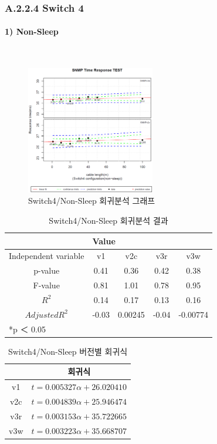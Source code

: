 \documentclass[11pt
  , a4paper
  , article
  , oneside
]{memoir}
\begin{document}
\subsubsection{A.2.2.4 Switch 4}
\paragraph{1) Non-Sleep}
   　
\begin{figure}[h!]
  \centering
  \includegraphics[width=0.5\textwidth]{./images/s4sx.eps}
  \caption{Switch4/Non-Sleep 회귀분석 그래프}
\end{figure}


\begin{table}[!htb]
\begin{center}
\begin{tabular}{c|c|c|c|c}\hline
& \multicolumn{4}{l}{Value} \\ \hline
Independent variable & v1 & v2c & v3r & v3w \\ \hline\hline
p-value& 0.41 & 0.36 & 0.42 & 0.38 \\ \hline
F-value& 0.81 & 1.01 & 0.78 & 0.95 \\ \hline
$  R^2  $ & 0.14 & 0.17 & 0.13 & 0.16 \\\hline
$ Adjusted R^2 $ & -0.03 & 0.00245 & -0.04 & -0.00774 \\\hline 
\multicolumn{5}{l}{*p ＜ 0.05} \\ \hline
\end{tabular}
\caption{Switch4/Non-Sleep 회귀분석 결과}
\end{center}
\end{table} 

\begin{table}[!htb]
\begin{center}
\begin{tabular}{c|c}\hline
 & 회귀식  \\ \hline\hline
v1 &  $ t=0.005327\alpha + 26.020410 $  \\ 
v2c & $ t=0.004839\alpha + 25.946474 $ \\ 
v3r & $ t=0.003153\alpha + 35.722665 $ \\ 
v3w & $ t=0.003223\alpha + 35.668707 $  \\ \hline
\end{tabular}
\caption{Switch4/Non-Sleep 버전별 회귀식}
\end{center}
\end{table} 
\end{document}
